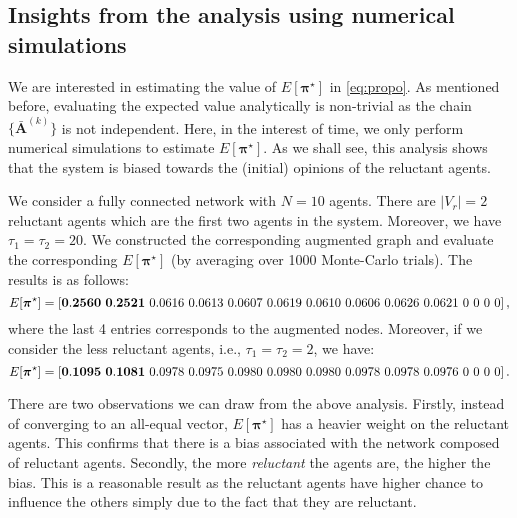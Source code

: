 \documentclass[letter]{article}
\newtheorem{prop}{Proposition}
\theoremstyle{remark}
\begin{document}

\subsection{Insights from the analysis using numerical simulations} \label{sec:bias}
We are interested in estimating the value of $E [ \bm{\pi}^\star ]$ in \eqref{eq:propo}. As mentioned before, evaluating the expected value analytically is non-trivial as the chain $\{ \bar{\bm A}^{(k)} \}$ is not independent. Here, in the interest of time, we only perform numerical simulations to estimate $E [ \bm{\pi}^\star ]$. As we shall see, this analysis shows that the system is biased towards the (initial) opinions of the reluctant agents. 

We consider a fully connected network with $N=10$ agents. There are $|V_r| = 2$ reluctant agents which are the first two agents in the system. Moreover, we have $\tau_1 = \tau_2 = 20$. 
We constructed the corresponding augmented graph and  evaluate the corresponding $E[\bm{\pi}^\star]$ (by averaging over 1000 Monte-Carlo trials). The results is as follows:
\[
E[\bm{\pi}^\star] = \left[  {\bf 0.2560~0.2521}~0.0616~ 0.0613~0.0607~0.0619~0.0610~ 0.0606~0.0626~0.0621~0~0~0~0 \right],
\]
where the last 4 entries corresponds to the augmented nodes. Moreover, if we consider the less reluctant agents, i.e., $\tau_1 = \tau_2 = 2$, we have:
\[
E[\bm{\pi}^\star] = \left[  {\bf 0.1095~0.1081}~0.0978~0.0975~0.0980~0.0980~0.0980~0.0978~0.0978~0.0976~0~0~0~0 \right].
\]

There are two observations we can draw from the above analysis. Firstly, instead of converging to an all-equal vector, $E[\bm{\pi}^\star]$ has  a heavier weight on the reluctant agents. This confirms that there is a bias associated with the network composed of reluctant agents. Secondly, the more \emph{reluctant} the agents are, the higher the bias. This is a reasonable result as the reluctant agents have higher chance to influence the others simply due to the fact that they are reluctant. 
\end{document}
